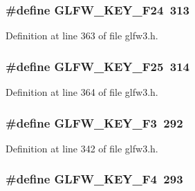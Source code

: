 \subsubsection[{G\+L\+F\+W\+\_\+\+K\+E\+Y\+\_\+\+F24}]{\setlength{\rightskip}{0pt plus 5cm}\#define G\+L\+F\+W\+\_\+\+K\+E\+Y\+\_\+\+F24~313}\label{group__keys_ga8150374677b5bed3043408732152dea2}


Definition at line 363 of file glfw3.\+h.

\hypertarget{group__keys_gaa4bbd93ed73bb4c6ae7d83df880b7199}{}
\subsubsection[{G\+L\+F\+W\+\_\+\+K\+E\+Y\+\_\+\+F25}]{\setlength{\rightskip}{0pt plus 5cm}\#define G\+L\+F\+W\+\_\+\+K\+E\+Y\+\_\+\+F25~314}\label{group__keys_gaa4bbd93ed73bb4c6ae7d83df880b7199}


Definition at line 364 of file glfw3.\+h.

\hypertarget{group__keys_gaed7cd729c0147a551bb8b7bb36c17015}{}
\subsubsection[{G\+L\+F\+W\+\_\+\+K\+E\+Y\+\_\+\+F3}]{\setlength{\rightskip}{0pt plus 5cm}\#define G\+L\+F\+W\+\_\+\+K\+E\+Y\+\_\+\+F3~292}\label{group__keys_gaed7cd729c0147a551bb8b7bb36c17015}


Definition at line 342 of file glfw3.\+h.

\hypertarget{group__keys_ga9b61ebd0c63b44b7332fda2c9763eaa6}{}
\subsubsection[{G\+L\+F\+W\+\_\+\+K\+E\+Y\+\_\+\+F4}]{\setlength{\rightskip}{0pt plus 5cm}\#define G\+L\+F\+W\+\_\+\+K\+E\+Y\+\_\+\+F4~293}\label{group__keys_ga9b61ebd0c63b44b7332fda2c9763eaa6}


